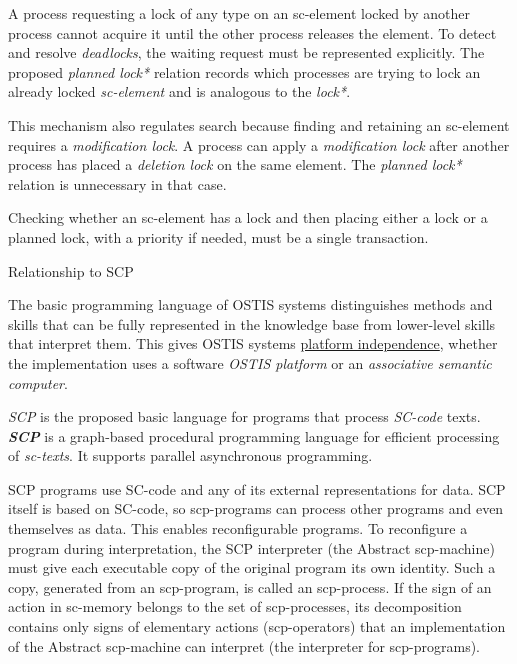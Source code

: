 \begin{frame}{}
	\topline
	\justifying
	\vspace{10mm}

A process requesting a lock of any type on an sc-element locked by another process cannot acquire it until the other process releases the element. To detect and resolve \textit{deadlocks}, the waiting request must be represented explicitly. The proposed \textit{planned lock*} relation records which processes are trying to lock an already locked \textit{sc-element} and is analogous to the \textit{lock*}.
\end{frame}

\begin{frame}{}
	\topline
	\justifying
	\setlength{\emergencystretch}{2em}
	\vspace{10mm}

This mechanism also regulates search because finding and retaining an sc-element requires a \textit{modification lock}. A process can apply a \textit{modification lock} after another process has placed a \textit{deletion lock} on the same element. The \textit{planned lock*} relation is unnecessary in that case.

Checking whether an sc-element has a lock and then placing either a lock or a planned lock, with a priority if needed, must be a single transaction.
\end{frame}

\begin{frame}{Relationship to SCP}
\topline
\justifying
\vspace{10mm}


    The basic programming language of OSTIS systems distinguishes methods and skills that can be fully represented in the knowledge base from lower-level skills that interpret them. This gives OSTIS systems \uline{platform independence}, whether the implementation uses a software \textit{OSTIS platform} or an \textit{associative semantic computer}.
    \par \textit{SCP} is the proposed basic language for programs that process \textit{SC-code} texts. \textbf{\textit{SCP}} is a graph-based procedural programming language for efficient processing of \textit{sc-texts}. It supports parallel asynchronous programming.
\end{frame}

\begin{frame}{}
\topline
\justifying
\vspace{10mm}

SCP programs use SC-code and any of its external representations for data. SCP itself is based on SC-code, so scp-programs can process other programs and even themselves as data. This enables reconfigurable programs. To reconfigure a program during interpretation, the SCP interpreter (the Abstract scp-machine) must give each executable copy of the original program its own identity. Such a copy, generated from an scp-program, is called an scp-process. If the sign of an action in sc-memory belongs to the set of scp-processes, its decomposition contains only signs of elementary actions (scp-operators) that an implementation of the Abstract scp-machine can interpret (the interpreter for scp-programs).
\end{frame}

